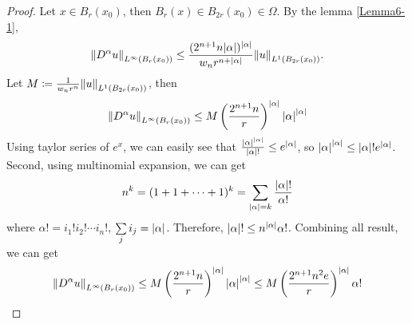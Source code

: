 \documentclass{article}
\begin{document}
\begin{enumerate}
\begin{proof}
Let $x\in B_r(x_0)$, then $B_r(x)\in B_{2r}(x_0)\in \Omega$. By the lemma \ref{Lemma6-1},
\begin{equation*}
\norm{D^\alpha u}_{L^\infty(B_r(x_0))}\leq \frac{(2^{n+1}n\abs{\alpha})^\abs{\alpha}}{w_n r^{n+\abs{\alpha}}}\norm{u}_{L^1(B_{2r}(x_0))}.
\end{equation*}
Let $M\coloneqq \frac{1}{w_n r^n}\norm{u}_{L^1(B_{2r}(x_0))}$, then
\begin{equation*}
\norm{D^\alpha u}_{L^\infty(B_r(x_0))}\leq M\left(\frac{2^{n+1}n}{r}\right)^\abs{\alpha}\abs{\alpha}^\abs{\alpha}
\end{equation*}
Using taylor series of $e^x$, we can easily see that $\frac{\abs{\alpha}^\abs{\alpha}}{\abs{\alpha}!}\leq e^\abs{\alpha}$, so $\abs{\alpha}^\abs{\alpha}\leq \abs{\alpha}!e^\abs{\alpha}$. Second, using multinomial expansion, we can get
\begin{equation*}
n^k=(1+1+\cdots+1)^k=\sum\limits_{\abs{\alpha}=k}\frac{\abs{\alpha}!}{\alpha !}
\end{equation*}
where $\alpha !=i_1 !i_2!\cdots i_n!$, $\sum\limits_j i_j=\abs{\alpha}$. Therefore, $\abs{\alpha}!\leq n^\abs{\alpha} \alpha !$. Combining all result, we can get
\begin{equation}\label{Eq:6-1}
\norm{D^\alpha u}_{L^\infty(B_r(x_0))}\leq M \left(\frac{2^{n+1}n}{r}\right)^\abs{\alpha}\abs{\alpha}^\abs{\alpha}\leq M \left(\frac{2^{n+1}n^2e}{r}\right)^\abs{\alpha}\alpha !
\end{equation}


\end{proof}
\end{enumerate}
\end{document}
